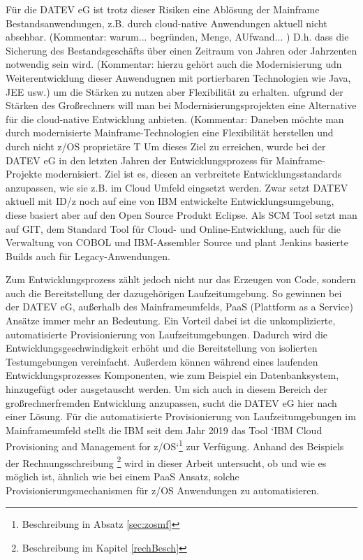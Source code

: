 Für die DATEV eG ist trotz dieser Risiken eine Ablösung der Mainframe Bestandsanwendungen, z.B. durch cloud-native Anwendungen aktuell nicht absehbar. (Kommentar: warum... begründen, Menge, AUfwand... )
D.h. dass die Sicherung des Bestandsgeschäfts über einen Zeitraum von Jahren oder Jahrzenten notwendig sein wird. 
(Kommentar: hierzu gehört auch die Modernisierung udn Weiterentwicklung dieser Anwendugnen mit portierbaren Technologien wie Java, JEE usw.) um die Stärken zu nutzen aber Flexibilität zu erhalten.
ufgrund der Stärken des Großrechners will man bei Modernisierungsprojekten eine Alternative für die cloud-native Entwicklung anbieten.
(Kommentar: Daneben möchte man durch modernisierte Mainframe-Technologien eine Flexibilität herstellen und durch nicht z/OS proprietäre T
Um dieses Ziel zu erreichen, wurde bei der DATEV eG in den letzten Jahren der Entwicklungsprozess für Mainframe-Projekte modernisiert.
Ziel ist es, diesen an verbreitete Entwicklungsstandards anzupassen, wie sie z.B. im Cloud Umfeld eingsetzt werden. 
Zwar setzt DATEV aktuell mit ID/z noch auf eine von IBM entwickelte Entwicklungsumgebung, diese basiert aber auf den Open Source Produkt Eclipse. Als SCM Tool setzt man auf GIT, dem Standard Tool für Cloud- und Online-Entwicklung, auch für die Verwaltung von COBOL und IBM-Assembler Source und plant Jenkins basierte Builds auch für Legacy-Anwendungen.

Zum Entwicklungsprozess zählt jedoch nicht nur das Erzeugen von Code, sondern auch die Bereitstellung der dazugehörigen Laufzeitumgebung.
So gewinnen bei der DATEV eG, außerhalb des Mainframeumfelds, PaaS (Plattform as a Service) Ansätze immer mehr an Bedeutung.
Ein Vorteil dabei ist die unkomplizierte, automatisierte Provisionierung von Laufzeitumgebungen.
Dadurch wird die Entwicklungsgeschwindigkeit erhöht und die Bereitstellung von isolierten Testumgebungen vereinfacht.
Außerdem können während eines laufenden Entwicklungsprozesses Komponenten, wie zum Beispiel ein Datenbanksystem, hinzugefügt oder ausgetauscht werden.
Um sich auch in diesem Bereich der großrechnerfremden Entwicklung anzupassen, sucht die DATEV eG hier nach einer Lösung.
Für die automatisierte Provisionierung von Laufzeitumgebungen im Mainframeumfeld stellt die IBM seit dem Jahr 2019 das Tool `IBM Cloud Provisioning and Management for z/OS`\footnote{Beschreibung in Absatz \ref{sec:zosmf}} zur Verfügung.
Anhand des Beispiels der Rechnungsschreibung \footnote{Beschreibung im Kapitel \ref{rechBesch}} wird in dieser Arbeit untersucht, ob und wie es möglich ist, ähnlich wie bei einem PaaS Ansatz, solche Provisionierungsmechanismen für z/OS Anwendungen zu automatisieren.
